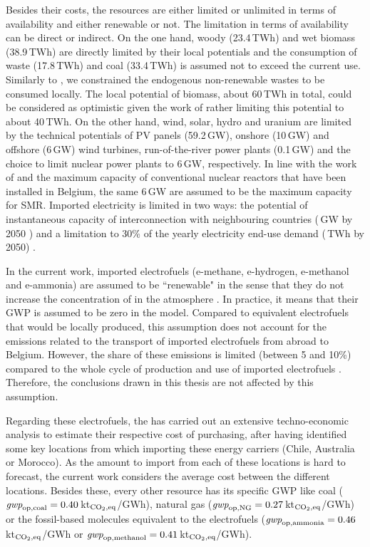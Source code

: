 Besides their costs, the resources are either limited or unlimited in terms of availability and either renewable or not. The limitation in terms of availability can be direct or indirect. On the one hand, woody (23.4\,TWh) and wet biomass (38.9\,TWh) are directly limited by their local potentials and the consumption of waste (17.8\,TWh) and coal (33.4\,TWh) is assumed not to exceed the current use. Similarly to \citet{limpens2021generating}, we constrained the endogenous non-renewable wastes to be consumed locally. The local potential of biomass, \ie about 60\,TWh in total, could be considered as optimistic given the work of \citet{colla2024navigating} rather limiting this potential to about 40\,TWh. On the other hand, wind, solar, hydro and uranium are limited by the technical potentials of \gls{PV} panels (59.2\,GW), onshore (10\,GW) and offshore (6\,GW) wind turbines, run-of-the-river power plants (0.1\,GW) and the choice to limit nuclear power plants to 6\,GW, respectively. In line with the work of \citet{PATHS2050} and the maximum capacity of conventional nuclear reactors that have been installed in Belgium, the same 6\,GW are assumed to be the maximum capacity for \gls{SMR}. Imported electricity is limited in two ways: the potential of instantaneous capacity of interconnection with neighbouring countries (\,GW by 2050 \cite{ELIA_2050}) and a limitation to 30\% of the yearly electricity end-use demand (\,TWh by 2050) \cite{limpens2021generating}. 

In the current work, imported electrofuels (\ie e-methane, e-hydrogen, e-methanol and e-ammonia) are assumed to be ``renewable" in the sense that they do not increase the concentration of  in the atmosphere \cite{rixhon2021terminology}. In practice, it means that their \gls{GWP} is assumed to be zero in the model. Compared to equivalent electrofuels that would be locally produced, this assumption does not account for the emissions related to the transport of imported electrofuels from abroad to Belgium. However, the share of these emissions is limited (between 5 and 10\%) compared to the whole cycle of production and use of imported electrofuels \cite{coppitters2024towards}. Therefore, the conclusions drawn in this thesis are not affected by this assumption.

Regarding these electrofuels, the \citet{h2coalition} has carried out an extensive techno-economic analysis to estimate their respective cost of purchasing, after having identified some key locations from which importing these energy carriers (\eg Chile, Australia or Morocco). As the amount to import from each of these locations is hard to forecast, the current work considers the average cost between the different locations. Besides these, every other resource has its specific \gls{GWP} like coal ($\emph{gwp}_{\mathrm{op,coal}}=0.40$\,kt$_{\ce{CO2},\text{eq}}$/GWh), natural gas ($\emph{gwp}_{\mathrm{op,NG}}=0.27$\,kt$_{\ce{CO2},\text{eq}}$/GWh) or the fossil-based molecules equivalent to the electrofuels (\eg $\emph{gwp}_{\mathrm{op,ammonia}}=0.46$\,kt$_{\ce{CO2},\text{eq}}$/GWh or $\emph{gwp}_{\mathrm{op,methanol}}=0.41$\,kt$_{\ce{CO2},\text{eq}}$/GWh).


